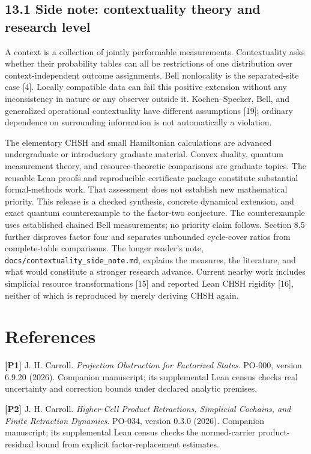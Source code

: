 \documentclass[
]{article}
\begin{document}
\subsection{13.1 Side note: contextuality theory and research level}\label{side-note-contextuality-theory-and-research-level}

A context is a collection of jointly performable measurements. Contextuality asks whether their probability tables can all be restrictions of one distribution over context-independent outcome assignments. Bell nonlocality is the separated-site case {[}4{]}. Locally compatible data can fail this positive extension without any inconsistency in nature or any observer outside it. Kochen--Specker, Bell, and generalized operational contextuality have different assumptions {[}19{]}; ordinary dependence on surrounding information is not automatically a violation.

The elementary CHSH and small Hamiltonian calculations are advanced undergraduate or introductory graduate material. Convex duality, quantum measurement theory, and resource-theoretic comparisons are graduate topics. The reusable Lean proofs and reproducible certificate package constitute substantial formal-methods work. That assessment does not establish new mathematical priority. This release is a checked synthesis, concrete dynamical extension, and exact quantum counterexample to the factor-two conjecture. The counterexample uses established chained Bell measurements; no priority claim follows. Section 8.5 further disproves factor four and separates unbounded cycle-cover ratios from complete-table comparisons. The longer reader's note, \texttt{docs/contextuality\_side\_note.md}, explains the measures, the literature, and what would constitute a stronger research advance. Current nearby work includes simplicial resource transformations {[}15{]} and reported Lean CHSH rigidity {[}16{]}, neither of which is reproduced by merely deriving CHSH again.

\section{References}\label{references}

\textbf{{[}P1{]}} J. H. Carroll. \emph{Projection Obstruction for Factorized States}. PO-000, version 6.9.20 (2026). Companion manuscript; its supplemental Lean census checks real uncertainty and correction bounds under declared analytic premises.

\textbf{{[}P2{]}} J. H. Carroll. \emph{Higher-Cell Product Retractions, Simplicial Cochains, and Finite Retraction Dynamics}. PO-034, version 0.3.0 (2026). Companion manuscript; its supplemental Lean census checks the normed-carrier product-residual bound from explicit factor-replacement estimates.
\end{document}
